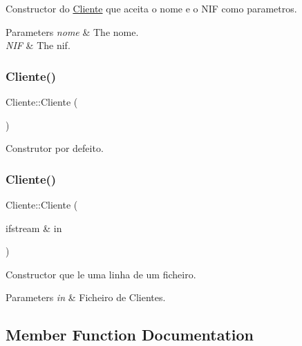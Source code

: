 Constructor do \hyperlink{class_cliente}{Cliente} que aceita o nome e o N\+IF como parametros. 


\begin{DoxyParams}{Parameters}
{\em nome} & The nome. \\
\hline
{\em N\+IF} & The nif. \\
\hline
\end{DoxyParams}
\hypertarget{class_cliente_ab6a372f412692c12c4be4427b00a3f6e}{}\label{class_cliente_ab6a372f412692c12c4be4427b00a3f6e} 
\subsubsection{\texorpdfstring{Cliente()}{Cliente()}\hspace{0.1cm}{\footnotesize\ttfamily [2/3]}}
{\footnotesize\ttfamily Cliente\+::\+Cliente (\begin{DoxyParamCaption}{ }\end{DoxyParamCaption})}



Construtor por defeito. 

\hypertarget{class_cliente_a6ea9b20d8340c4f6df9bb6a79e828ccc}{}\label{class_cliente_a6ea9b20d8340c4f6df9bb6a79e828ccc} 
\subsubsection{\texorpdfstring{Cliente()}{Cliente()}\hspace{0.1cm}{\footnotesize\ttfamily [3/3]}}
{\footnotesize\ttfamily Cliente\+::\+Cliente (\begin{DoxyParamCaption}\item[{ifstream \&}]{in }\end{DoxyParamCaption})}



Constructor que le uma linha de um ficheiro. 


\begin{DoxyParams}{Parameters}
{\em in} & Ficheiro de Clientes. \\
\hline
\end{DoxyParams}


\subsection{Member Function Documentation}
\hypertarget{class_cliente_a243d3f408b70d3ab6466dfa32b9f40a6}{}\label{class_cliente_a243d3f408b70d3ab6466dfa32b9f40a6} 
